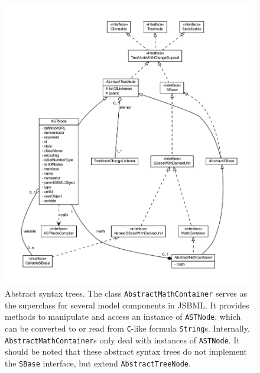 \begin{figure}[p]
 \centering
 \includegraphics[width=\textwidth]{img/ASTNode.pdf}
 \caption[Abstract syntax trees]{Abstract syntax trees. The class
 \texttt{AbstractMathContainer} serves as the superclass for several model
 components in JSBML. It provides methods to manipulate and access an instance 
 of \texttt{ASTNode}, which can be converted to or read from \texttt{C}-like
 formula \texttt{String}s. Internally, \texttt{AbstractMathContainer}s only
 deal with instances of \texttt{ASTNode}. It should be noted that these
 abstract syntax trees do not implement the \texttt{SBase} interface, but
 extend \texttt{AbstractTreeNode}.}
 \label{fig:MathContainer}
\end{figure}
